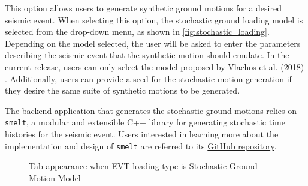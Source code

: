 This option allows users to generate synthetic ground motions for a
desired seismic event. When selecting this option, the stochastic
ground loading model is selected from the drop-down menu, as shown
in \autoref{fig:stochastic_loading}. Depending on the model selected,
the user will be asked to enter the parameters describing the seismic
event that the synthetic motion should emulate. In the current
release, users can only select the model proposed by Vlachos et
al. (2018) \cite{vlachos2018predictive}. Additionally, users can
provide a seed for the stochastic motion generation if they desire the
same suite of synthetic motions to be generated.

The backend application that generates the stochastic ground motions
relies on \texttt{smelt}, a modular and extensible C++ library for
generating stochastic time histories for the seismic event. Users
interested in learning more about the implementation and design of
\texttt{smelt} are referred to its
\href{https://github.com/shellshocked2003/Stochastic-Loading-Module}{GitHub repository}.

\begin{figure}[!htbp]
  \caption{Tab appearance when EVT loading type is Stochastic Ground
  Motion Model}
  \label{fig:stochastic_loading}
\end{figure}
